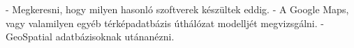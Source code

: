
- Megkeresni, hogy milyen hasonló szoftverek készültek eddig.
- A Google Maps, vagy valamilyen egyéb térképadatbázis úthálózat modelljét megvizsgálni.
- GeoSpatial adatbázisoknak utánanézni.
